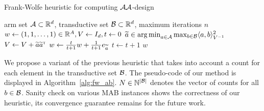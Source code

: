 

\begin{algorithm}[ht]
\centering
\caption{Frank-Wolfe heuristic for computing $\mathcal{A}\mathcal{A}$-design}
\label{alg:fw_aa}
\begin{algorithmic}
    arm set $\mathcal{A}\subset\mathbb{R}^d$, transductive set $\mathcal{B}\subset\mathbb{R}^d$, maximum iterations $n$
    $w \leftarrow{} (1, 1, \ldots, 1)\in\mathbb{R}^A, V \leftarrow{} I_d, t \leftarrow{} 0$
        \State $\widetilde{a}\in\operatorname*{arg\,min}_{a\in\mathcal{A}}\max_{b\in\mathcal{B}}\langle a,b\rangle_{V^{-1}}^2$%
        \State $V \leftarrow{} V + \widetilde{a} \widetilde{a}^{\mathsf{\scriptscriptstyle T}}$
        \State $w \leftarrow{} \frac{t}{t+1}w+\frac{1}{t+1}e_{\widetilde{a}}$
        \State $t \leftarrow{} t+1$
   \EndWhile
    $w$
\end{algorithmic}
\end{algorithm}

We propose a variant of the previous heuristic that takes into account a count for each element in the transductive set $\mathcal{B}$. The pseudo-code of our method is displayed in Algorithm~\ref{alg:fw_ab}. $N\in{\mathbb N}^{|\mathcal{B}|}$ denotes the vector of counts for all $b\in\mathcal{B}$. Sanity check on various MAB instances shows the correctness of our heuristic, its convergence guarantee remains for the future work.

